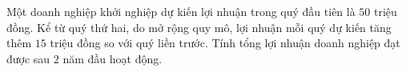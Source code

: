 \begin{ex}
Một doanh nghiệp khởi nghiệp dự kiến lợi nhuận trong quý đầu tiên là $50$ triệu đồng. Kể từ quý thứ hai, do mở rộng quy mô, lợi nhuận mỗi quý dự kiến tăng thêm $15$ triệu đồng so với quý liền trước. Tính tổng lợi nhuận doanh nghiệp đạt được sau $2$ năm đầu hoạt động.
\end{ex}
